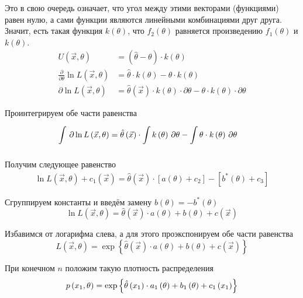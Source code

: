 Это в свою очередь означает,
что угол между этими векторами (функциями) равен нулю,
а сами функции являются линейными комбинациями друг друга.
Значит, есть такая функция $k\left( \theta \right)$, что
$f_2\left( \theta \right)$ равняется произведению
$f_1\left( \theta \right)$ и $k\left( \theta \right)$.
\begin{align*}
    U\left( \vec{x},\theta \right)
        &=\left( \hat{\theta}-\theta \right)\cdot k\left( \theta \right)\\
    \frac{\partial}{\partial\theta}\ln{L\left( \vec{x},\theta \right)}
        &=\hat{\theta}\cdot k\left( \theta \right)
            -\theta\cdot k\left( \theta \right)\\
    \partial\ln{L\left( \vec{x},\theta \right)}
        &=\hat{\theta}\left( \vec{x} \right)
                \cdot k\left( \theta \right)\cdot\partial\theta
            -\theta\cdot k\left( \theta \right)\cdot\partial\theta
\end{align*}

Проинтегрируем обе части равенства
\begin{align*}
    \int\limits_{}^{}  \, \partial \ln{L\left( \vec{x},\theta \right)}
        &=\hat{\theta}\left( \vec{x} \right)
                \cdot \int\limits_{}^{} k\left( \theta \right) \, \partial \theta
            -\int\limits_{}^{} \theta\cdot k\left( \theta \right) \, \partial \theta
\end{align*}

Получим следующее равенство
\begin{align*}
    \ln{L\left( \vec{x},\theta \right)}+c_1\left( \vec{x} \right)
        =\hat{\theta}\left( \vec{x} \right)
                \cdot \left[ a\left( \theta \right)+c_2\right]
            -\left[b^*\left( \theta \right)+c_3\right]
\end{align*}

Сгруппируем константы и введём замену
$b\left( \theta \right)=-b^*\left( \theta \right)$
$$\ln{L\left( \vec{x},\theta \right)}
    =\hat{\theta}\left( \vec{x} \right)\cdot a\left( \theta \right)
        +b\left( \theta \right)+c\left( \vec{x} \right)$$

Избавимся от логарифма слева, а для этого проэкспонируем обе части равенства
$$L\left( \vec{x},\theta \right)
    =\exp{\left\{\hat{\theta}\left( \vec{x} \right)\cdot a\left( \theta \right)
    +b\left( \theta \right)+c\left( \vec{x} \right)\right\}}$$

При конечном $n$ положим такую плотность распределения
$$p\left(x_1,\theta\right)
    =\exp{\left\{\hat{\theta}\left(x_1\right)\cdot a_1\left(\theta\right)
        +b_1\left( \theta \right)+c_1\left( x_1 \right)\right\}}$$

